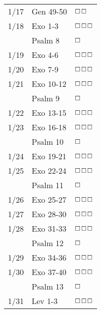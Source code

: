 \documentclass[10pt,landscape,letterpaper]{article}
\begin{document}
\begin{multicols}{5}
\begin{tabular}{p{0.15in}p{0.7in}p{0.5in}}
1/17 & Gen 49-50 & $\boxempty$$\boxempty$ \\
1/18 & Exo 1-3 & $\boxempty$$\boxempty$$\boxempty$ \\
 & \textcolor[rgb]{0.98,0.00,0.00}{Psalm 8} & \textcolor[rgb]{1.00,0.00,0.00}{$\boxempty$} \\
1/19 & Exo 4-6 & $\boxempty$$\boxempty$$\boxempty$ \\
1/20 & Exo 7-9 & $\boxempty$$\boxempty$$\boxempty$ \\
1/21 & Exo 10-12 & $\boxempty$$\boxempty$$\boxempty$ \\
 & \textcolor[rgb]{0.98,0.00,0.00}{Psalm 9} & \textcolor[rgb]{1.00,0.00,0.00}{$\boxempty$} \\
1/22 & Exo 13-15 & $\boxempty$$\boxempty$$\boxempty$ \\
1/23 & Exo 16-18 & $\boxempty$$\boxempty$$\boxempty$ \\
 & \textcolor[rgb]{0.98,0.00,0.00}{Psalm 10} & \textcolor[rgb]{1.00,0.00,0.00}{$\boxempty$} \\
1/24 & Exo 19-21 & $\boxempty$$\boxempty$$\boxempty$ \\
1/25 & Exo 22-24 & $\boxempty$$\boxempty$$\boxempty$ \\
 & \textcolor[rgb]{0.98,0.00,0.00}{Psalm 11} & \textcolor[rgb]{1.00,0.00,0.00}{$\boxempty$} \\
1/26 & Exo 25-27 & $\boxempty$$\boxempty$$\boxempty$ \\
1/27 & Exo 28-30 & $\boxempty$$\boxempty$$\boxempty$ \\
1/28 & Exo 31-33 & $\boxempty$$\boxempty$$\boxempty$ \\
 & \textcolor[rgb]{0.98,0.00,0.00}{Psalm 12} & \textcolor[rgb]{1.00,0.00,0.00}{$\boxempty$} \\
1/29 & Exo 34-36 & $\boxempty$$\boxempty$$\boxempty$ \\
1/30 & Exo 37-40 & $\boxempty$$\boxempty$$\boxempty$ \\
 & \textcolor[rgb]{0.98,0.00,0.00}{Psalm 13} & \textcolor[rgb]{1.00,0.00,0.00}{$\boxempty$} \\
1/31 & Lev 1-3 & $\boxempty$$\boxempty$$\boxempty$ \\
 \end{tabular}



\end{multicols}
\end{document}
